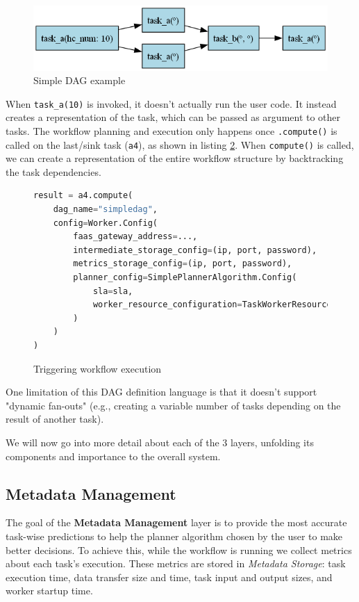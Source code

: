 \documentclass[conference]{IEEEtran}
\begin{document}
\begin{figure}[h]
    \centering
    \includegraphics[width=\columnwidth]{figures/dag_lang_example.png}
    \caption{Simple DAG example}
    \label{fig:dag_example}
\end{figure}

When \texttt{task\_a(10)} is invoked, it doesn't actually run the user code. It instead creates a representation of the task, which can be passed as argument to other tasks. The workflow planning and execution only happens once \texttt{.compute()} is called on the last/sink task (\texttt{a4}), as shown in listing \ref{lst:triggering_workflow_execution}. When \texttt{compute()} is called, we can create a representation of the entire workflow structure by backtracking the task dependencies.

\begin{figure}[h]
\centering
\begin{lstlisting}[language=Python, basicstyle=\ttfamily\footnotesize, columns=fullflexible, breaklines=true]
result = a4.compute(
    dag_name="simpledag", 
    config=Worker.Config(
        faas_gateway_address=...,
        intermediate_storage_config=(ip, port, password),
        metrics_storage_config=(ip, port, password),
        planner_config=SimplePlannerAlgorithm.Config(
            sla=sla,
            worker_resource_configuration=TaskWorkerResourceConfiguration(cpus=3, memory_mb=512),
        )
    )
)
\end{lstlisting}
\caption{Triggering workflow execution}
\label{lst:triggering_workflow_execution}
\end{figure}

One limitation of this DAG definition language is that it doesn't support "dynamic fan-outs" (e.g., creating a variable number of tasks depending on the result of another task). 

We will now go into more detail about each of the 3 layers, unfolding its components and importance to the overall system.

\subsection{Metadata Management}
\label{ss:metadata_management}
The goal of the \textbf{Metadata Management} layer is to provide the most accurate task-wise predictions to help the planner algorithm chosen by the user to make better decisions. To achieve this, while the workflow is running we collect metrics about each task's execution. These metrics are stored in \textit{Metadata Storage}: task execution time, data transfer size and time, task input and output sizes, and worker startup time. 
\end{document}
